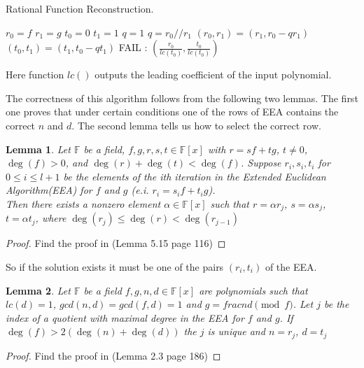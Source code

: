 \documentclass[12pt]{article}
\newtheorem{lemma}{Lemma}
\begin{document}
\begin{algorithm}
\caption{Rational Function Reconstruction.}\label{RFR}
\begin{algorithmic}[1]
    \State $r_0 = f$  $r_1 = g$
    \State $t_0 = 0$  $t_1 = 1$
    \State $q = 1$
        \State $q = r_0 // r_1$
        \State $(r_0, r_1) = (r_1, r_0 - qr_1)$
        \State $(t_0, t_1) = (t_1, t_0 - qt_1)$
    \EndWhile
        \State \Return FAIL
    \Else:
            \State \Return  $(\frac{r_0}{lc(t_0)}, \frac{t_0}{lc(t_0)})$
    \EndIf
\EndProcedure
\end{algorithmic}
\end{algorithm}
Here function $lc()$ outputs the leading coefficient of the input polynomial.


The correctness of this algorithm follows from the following two lemmas. The first one proves that under certain conditions one of the rows of EEA contains the correct $n$ and $d$. The second lemma tells us how to select the correct row.

\begin{lemma}
Let $\mathbb{F}$ be a field, $f, g, r, s, t \in \mathbb{F}[x]$ with $r = sf + tg$, $t \neq 0$, $\deg(f) > 0$, and $\deg(r) + \deg(t) <\deg(f)$.
Suppose $r_i, s_i, t_i$ for $0 \leq i \leq l + 1$ be the elements of the ith iteration in the Extended Euclidean Algorithm(EEA) for $f$ and $g$ (e.i. $r_i = s_if + t_ig$). \\
Then there exists a nonzero element $\alpha \in \mathbb{F}[x]$ such that $r = \alpha r_j$, $s = \alpha s_j$, $t = \alpha t_j$, where $\deg(r_j) \leq \deg(r) < \deg(r_{j-1})$
\end{lemma}
\begin{proof}
Find the proof in \cite{[GG13]} (Lemma 5.15 page 116)
\end{proof}

So if the solution exists it must be one of the pairs $(r_i, t_i)$ of the EEA.

\begin{lemma}
Let $\mathbb{F}$ be a field $f,g,n,d \in \mathbb{F}[x]$ are polynomials such that $lc(d) = 1$, $gcd(n,d) = gcd(f,d) = 1$ and $g = frac{n}{d} \pmod{f}$. Let $j$ be the index of a quotient with maximal degree in the EEA for $f$ and $g$. If $\deg(f) > 2(\deg(n) + \deg(d))$ the $j$ is unique and $n = r_j$, $d = t_j$
\end{lemma}
\begin{proof}
Find the proof in \cite{[KM06]} (Lemma 2.3 page 186)
\end{proof}
\end{document}
